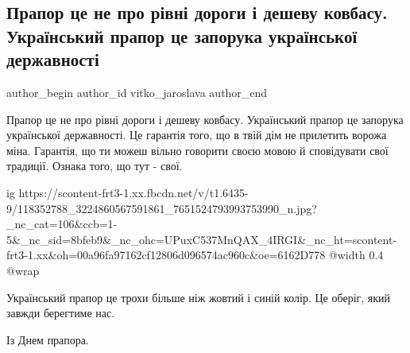  
 
 
 
 
 
\subsection{Прапор це не про рівні дороги і дешеву ковбасу. Український прапор це запорука української державності}
\label{sec:23_08_2020.fb.vitko_jaroslava.1.flag_dorogi_kolbasa}
 
\ifcmt
 author_begin
   author_id vitko_jaroslava
 author_end
\fi

Прапор це не про рівні дороги і дешеву ковбасу. Український прапор це запорука
української державності. Це гарантія того, що в твій дім не прилетить ворожа
міна. Гарантія, що ти можеш вільно говорити своєю мовою й сповідувати свої
традиції. Ознака того, що тут - свої.

\ifcmt
  ig https://scontent-frt3-1.xx.fbcdn.net/v/t1.6435-9/118352788_3224860567591861_7651524793993753990_n.jpg?_nc_cat=106&ccb=1-5&_nc_sid=8bfeb9&_nc_ohc=UPuxC537MnQAX_4IRGI&_nc_ht=scontent-frt3-1.xx&oh=00a96fa97162cf12806d096574ac960c&oe=6162D778
  @width 0.4
  @wrap 
\fi

Український прапор це трохи більше ніж жовтий і синій колір. Це оберіг, який
завжди берегтиме нас.

Із Днем прапора.
